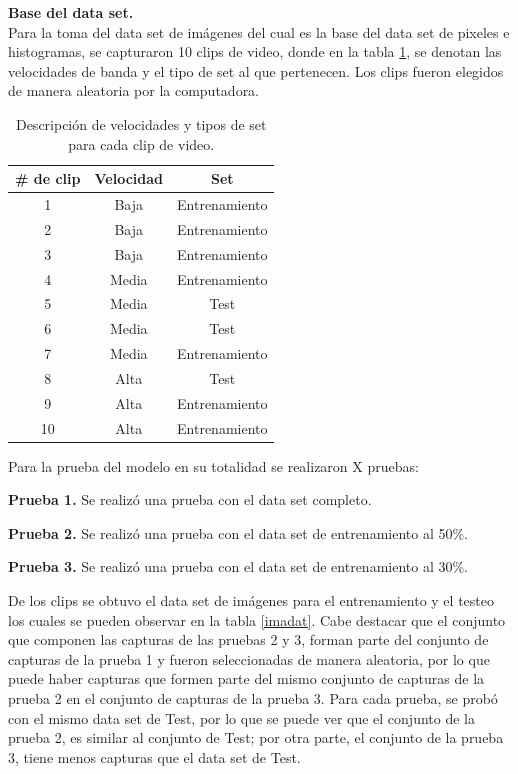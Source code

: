 \documentclass[twoside,spanish,ESP,MSc]{plantillaLabUPV}
\theoremstyle{definition}
\begin{document}
\checkmark\textbf{Base del data set.}\\
Para la toma del data set de imágenes del cual es la base del data set de pixeles e histogramas, se capturaron 10 clips de video, donde en la tabla \ref{clips}, se denotan las velocidades de banda y el tipo de set al que pertenecen. Los clips fueron elegidos de manera aleatoria por la computadora.


\begin{table}[h]
	\caption{Descripción de velocidades y tipos de set para cada clip de video.}
	\label{clips}
	\centering
	\begin{tabular}{|c|c|c|}
		\hline
		\# de clip & Velocidad & Set \\
		\hline
		1 & Baja & Entrenamiento \\
		\hline
		2 & Baja & Entrenamiento \\
		\hline
		3 & Baja & Entrenamiento \\
		\hline
		4 & Media & Entrenamiento \\
		\hline
		5 & Media & Test \\
		\hline
		6 & Media & Test \\
		\hline
		7 & Media & Entrenamiento \\
		\hline
		8 & Alta & Test \\
		\hline
		9 & Alta & Entrenamiento \\
		\hline
		10 & Alta & Entrenamiento \\
		\hline
	\end{tabular}
\end{table}

Para la prueba del modelo en su totalidad se realizaron X pruebas:

\checkmark\textbf{Prueba 1.} Se realizó una prueba con el data set completo.

\checkmark\textbf{Prueba 2.} Se realizó una prueba con el data set de entrenamiento al 50\%.

\checkmark\textbf{Prueba 3.} Se realizó una prueba con el data set de entrenamiento al 30\%.


De los clips se obtuvo el data set de imágenes para el entrenamiento y el testeo los cuales se pueden observar en la tabla \ref{imadat}. Cabe destacar que el conjunto que componen las capturas de las pruebas 2 y 3, forman parte del conjunto de capturas de la prueba 1 y fueron seleccionadas de manera aleatoria, por lo que puede haber capturas que formen parte del mismo conjunto de capturas de la prueba 2 en el conjunto de capturas de la prueba 3. Para cada prueba, se probó con el mismo data set de Test, por lo que se puede ver que el conjunto de la prueba 2, es similar al conjunto de Test; por otra parte, el conjunto de la prueba 3, tiene menos capturas que el data set de Test.
\end{document}
